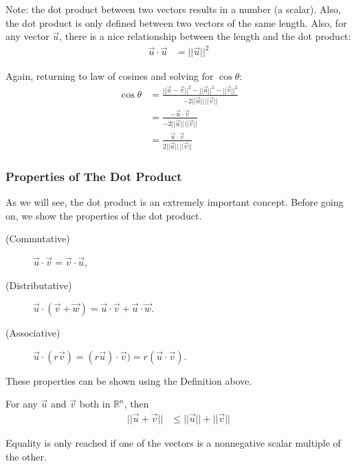 Note:  the dot product between two vectors results in a number (a scalar).  Also, the dot product is only defined between two vectors of the same length.  Also, for any vector $\vec{u}$, there is a nice relationship between the length and the dot product:
%
\begin{align*}
\vec{u} \cdot \vec{u}  & = ||\vec{u}||^2
\end{align*}

Again, returning to law of cosines and solving for $\cos \theta$:
%
\begin{align*}
\cos \theta & = \frac{||\vec{u}-\vec{v}||^2-||\vec{u}||^2-||\vec{v}||^2}{-2 ||\vec{u}|| \, ||\vec{v}||} \\
& = \frac{-\vec{u} \cdot \vec{v}}{-2 ||\vec{u}|| \, ||\vec{v}||} \\ 
& = \frac{\vec{u} \cdot \vec{v}}{2 ||\vec{u}|| \, ||\vec{v}||} 
\end{align*}

\subsubsection{Properties of The Dot Product} \label{sect:dot:prod:props}

As we will see, the dot product is an extremely important concept.  Before going on, we show the properties of the dot product.  

\begin{description}
\item[(Commutative)]   $\vec{u} \cdot \vec{v} = \vec{v} \cdot \vec{u}$, 
\item[(Distributative)] $\vec{u} \cdot (\vec{v} + \vec{w}) = \vec{u} \cdot \vec{v} + \vec{u} \cdot \vec{w}$.  
\item[(Associative)] $\vec{u} \cdot (r\vec{v}) = (r \vec{u}) \cdot \vec{v}) = r (\vec{u} \cdot \vec{v})$.  
\end{description}

These properties can be shown using the Definition above.  



\begin{theorem}
For any $\vec{u}$ and $\vec{v}$ both in $\mathbb{R}^n$, then 
%
\begin{align*}
||\vec{u}+\vec{v}|| &  \leq ||\vec{u}||+||\vec{v}|| 
\end{align*}

Equality is only reached if one of the vectors is a nonnegative scalar multiple of the other.  
\end{theorem}

